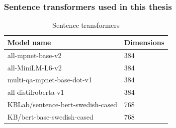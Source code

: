 \documentclass[aspectratio=1610]{beamer}
\begin{document}
\normalpage

\begin{frame}
  \frametitle{Sentence transformers used in this thesis}
\begin{table}[H]
  \begin{center}
    \caption{Sentence transformers}
    \label{tab:modeldimensions}
    \begin{tabular}{l|l}
    \textbf{Model name} & \textbf{Dimensions}  \\
    \hline
    all-mpnet-base-v2 & 384 \\    \hline
    all-MiniLM-L6-v2 & 384 \\    \hline
    multi-qa-mpnet-base-dot-v1 & 384 \\    \hline
    all-distilroberta-v1 & 384 \\    \hline
    KBLab/sentence-bert-swedish-cased & 768 \\    \hline
    KB/bert-base-swedish-cased & 768 \\    \hline
    \end{tabular}
  \end{center}
\end{table}
\end{frame}
\end{document}
